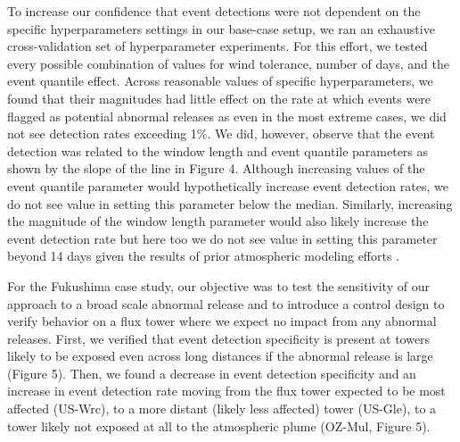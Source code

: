 \documentclass{article}
\begin{document}
To increase our confidence that event detections were not dependent on the specific hyperparameters settings in our base-case setup, we ran an exhaustive cross-validation set of hyperparameter experiments. For this effort, we tested every possible combination of values for wind tolerance, number of days, and the event quantile effect. Across reasonable values of specific hyperparameters, we found that their magnitudes had little effect on the rate at which events were flagged as potential abnormal releases as even in the most extreme cases, we did not see detection rates exceeding 1\%. We did, however, observe that the event detection was related to the window length and event quantile parameters as shown by the slope of the line in Figure 4. Although increasing values of the event quantile parameter would hypothetically increase event detection rates, we do not see value in setting this parameter below the median. Similarly, increasing the magnitude of the window length parameter would also likely increase the event detection rate but here too we do not see value in setting this parameter beyond 14 days given the results of prior atmospheric modeling efforts \citep[e.g.][]{meszarosPredictabilityDispersionFukushimaderived2016}.

For the Fukushima case study, our objective was to test the sensitivity of our approach to a broad scale abnormal release and to introduce a control design to verify behavior on a flux tower where we expect no impact from any abnormal releases. First, we verified that event detection specificity is present at towers likely to be exposed even across long distances if the abnormal release is large (Figure 5). Then, we found a decrease in event detection specificity and an increase in event detection rate moving from the flux tower expected to be most affected (US-Wrc), to a more distant (likely less affected) tower (US-Gle), to a tower likely not exposed at all to the atmospheric plume (OZ-Mul, Figure 5).
\end{document}
